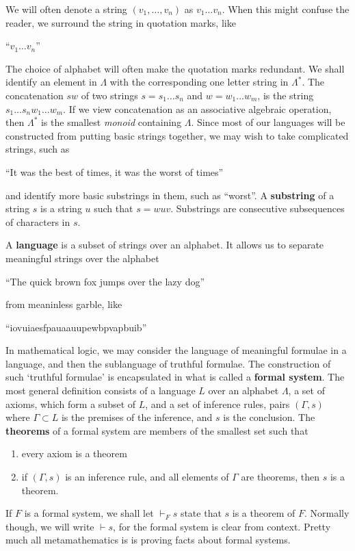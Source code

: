 We will often denote a string $(v_1, \dots, v_n)$ as $v_1 \dots v_n$. When this might confuse the reader, we surround the string in quotation marks, like
%
\begin{center}
    ``$v_1 \dots v_n$''
\end{center}
%
The choice of alphabet will often make the quotation marks redundant. We shall identify an element in $\Lambda$ with the corresponding one letter string in $\Lambda^*$. The concatenation $sw$ of two strings $s = s_1 \dots s_n$ and $w = w_1 \dots w_m$, is the string $s_1 \dots s_n w_1 \dots w_m$. If we view concatenation as an associative algebraic operation, then $\Lambda^*$ is the smallest {\it monoid} containing $\Lambda$. Since most of our languages will be constructed from putting basic strings together, we may wish to take complicated strings, such as
%
\begin{center}
    ``It was the best of times, it was the worst of times''
\end{center}
%
and identify more basic substrings in them, such as ``worst''. A {\bf substring} of a string $s$ is a string $u$ such that $s = wuv$. Substrings are consecutive subsequences of characters in $s$. 

A {\bf language} is a subset of strings over an alphabet. It allows us to separate meaningful strings over the alphabet
%
\begin{center}
    ``The quick brown fox jumps over the lazy dog''
\end{center}
%
from meaninless garble, like
%
\begin{center}
    ``iovuiaesfpauaauupewbpvapbuib''
\end{center}
%
In mathematical logic, we may consider the language of meaningful formulae in a language, and then the sublanguage of truthful formulae. The construction of such `truthful formulae' is encapsulated in what is called a {\bf formal system}. The most general definition consists of a language $L$ over an alphabet $\Lambda$, a set of axioms, which form a subset of $L$, and a set of inference rules, pairs $(\Gamma, s)$ where $\Gamma \subset L$ is the premises of the inference, and $s$ is the conclusion. The {\bf theorems} of a formal system are members of the smallest set such that
%
\begin{enumerate}
    \item every axiom is a theorem
    \item if $(\Gamma, s)$ is an inference rule, and all elements of $\Gamma$ are theorems, then $s$ is a theorem.
\end{enumerate}
%
If $F$ is a formal system, we shall let $\vdash_F s$ state that $s$ is a theorem of $F$. Normally though, we will write $\vdash s$, for the formal system is clear from context. Pretty much all metamathematics is is proving facts about formal systems.

